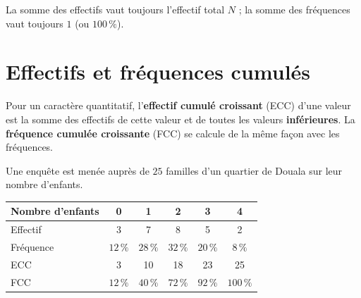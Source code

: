 \begin{remarque}
La somme des effectifs vaut toujours l'effectif total $N$ ; la somme des fréquences vaut
toujours $1$ (ou $100\,\%$).
\end{remarque}

\section{Effectifs et fréquences cumulés}

\begin{definition}
Pour un caractère quantitatif, l'\textbf{effectif cumulé croissant} (ECC) d'une valeur est
la somme des effectifs de cette valeur et de toutes les valeurs \textbf{inférieures}. La
\textbf{fréquence cumulée croissante} (FCC) se calcule de la même façon avec les
fréquences.
\end{definition}

\begin{exemple}
Une enquête est menée auprès de $25$ familles d'un quartier de Douala sur leur nombre
d'enfants.
\begin{center}
\small
\begin{tabular}{lccccc}
\toprule
Nombre d'enfants & 0 & 1 & 2 & 3 & 4 \\
\midrule
Effectif & 3 & 7 & 8 & 5 & 2 \\
Fréquence & $12\,\%$ & $28\,\%$ & $32\,\%$ & $20\,\%$ & $8\,\%$ \\
ECC & 3 & 10 & 18 & 23 & 25 \\
FCC & $12\,\%$ & $40\,\%$ & $72\,\%$ & $92\,\%$ & $100\,\%$ \\
\bottomrule
\end{tabular}
\end{center}
\end{exemple}

\begin{illus}
\end{illus}

